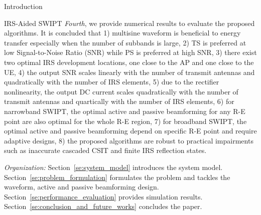 \documentclass[journal]{IEEEtran}
\begin{document}
\begin{section}{Introduction}
\begin{subsection}{IRS-Aided SWIPT}
			\emph{Fourth}, we provide numerical results to evaluate the proposed algorithms. It is concluded that 1) multisine waveform is beneficial to energy transfer especially when the number of subbands is large, 2) TS is preferred at low Signal-to-Noise Ratio (SNR) while PS is preferred at high SNR, 3) there exist two optimal IRS development locations, one close to the AP and one close to the UE, 4) the output SNR scales linearly with the number of transmit antennas and quadratically with the number of IRS elements, 5) due to the rectifier nonlinearity, the output DC current scales quadratically with the number of transmit antennas and quartically with the number of IRS elements, 6) for narrowband SWIPT, the optimal active and passive beamforming for any R-E point are also optimal for the whole R-E region, 7) for broadband SWIPT, the optimal active and passive beamforming depend on specific R-E point and require adaptive designs, 8) the proposed algorithms are robust to practical impairments such as inaccurate cascaded CSIT and finite IRS reflection states.

			\emph{Organization:} Section~\ref{se:system_model} introduces the system model. Section~\ref{se:problem_formulation} formulates the problem and tackles the waveform, active and passive beamforming design. Section~\ref{se:performance_evaluation} provides simulation results. Section~\ref{se:conclusion_and_future_works} concludes the paper.


\end{subsection}
\end{section}
\end{document}
